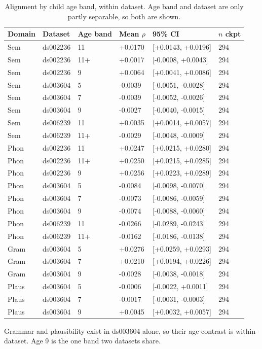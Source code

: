\begin{table}[t]
\centering
\small
\begin{tabular}{llllll}
\toprule
Domain & Dataset & Age band & Mean $\rho$ & 95\% CI & $n$ ckpt \\
\midrule
Sem & ds002236 & 11 & +0.0170 & [+0.0143, +0.0196] & 294 \\
Sem & ds002236 & 11+ & +0.0017 & [-0.0008, +0.0043] & 294 \\
Sem & ds002236 & 9 & +0.0064 & [+0.0041, +0.0086] & 294 \\
Sem & ds003604 & 5 & -0.0039 & [-0.0051, -0.0028] & 294 \\
Sem & ds003604 & 7 & -0.0039 & [-0.0052, -0.0026] & 294 \\
Sem & ds003604 & 9 & -0.0027 & [-0.0040, -0.0015] & 294 \\
Sem & ds006239 & 11 & +0.0035 & [+0.0014, +0.0057] & 294 \\
Sem & ds006239 & 11+ & -0.0029 & [-0.0048, -0.0009] & 294 \\
Phon & ds002236 & 11 & +0.0247 & [+0.0215, +0.0280] & 294 \\
Phon & ds002236 & 11+ & +0.0250 & [+0.0215, +0.0285] & 294 \\
Phon & ds002236 & 9 & +0.0256 & [+0.0223, +0.0289] & 294 \\
Phon & ds003604 & 5 & -0.0084 & [-0.0098, -0.0070] & 294 \\
Phon & ds003604 & 7 & -0.0073 & [-0.0086, -0.0059] & 294 \\
Phon & ds003604 & 9 & -0.0074 & [-0.0088, -0.0060] & 294 \\
Phon & ds006239 & 11 & -0.0266 & [-0.0289, -0.0243] & 294 \\
Phon & ds006239 & 11+ & -0.0162 & [-0.0186, -0.0138] & 294 \\
Gram & ds003604 & 5 & +0.0276 & [+0.0259, +0.0293] & 294 \\
Gram & ds003604 & 7 & +0.0210 & [+0.0194, +0.0226] & 294 \\
Gram & ds003604 & 9 & -0.0028 & [-0.0038, -0.0018] & 294 \\
Plaus & ds003604 & 5 & -0.0006 & [-0.0022, +0.0011] & 294 \\
Plaus & ds003604 & 7 & -0.0017 & [-0.0031, -0.0003] & 294 \\
Plaus & ds003604 & 9 & +0.0045 & [+0.0032, +0.0057] & 294 \\
\bottomrule
\end{tabular}
\vspace{2pt}
\begin{minipage}{\linewidth}\footnotesize Grammar and plausibility exist in ds003604 alone, so their age contrast is within-dataset. Age 9 is the one band two datasets share.\end{minipage}
\caption{Alignment by child age band, within dataset. Age band and dataset are only partly separable, so both are shown.}
\label{tab:t5}
\end{table}
